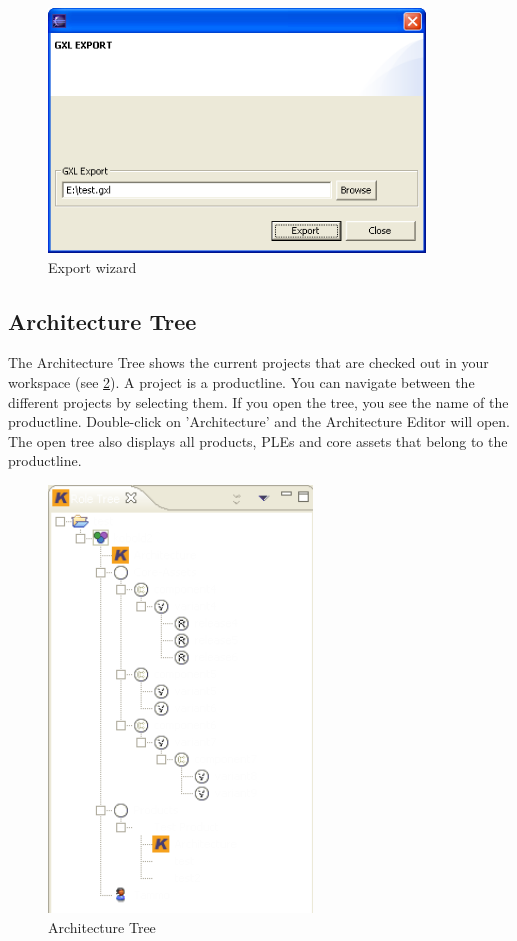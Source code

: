 \begin{figure}[h!]
\begin{center}
\includegraphics[width=10cm]{export.png}
   \caption{Export wizard}
\label{export}
\end{center}
\end{figure}\par







\subsection{Architecture Tree}

The Architecture Tree shows the current projects that are checked out in your workspace 
(see \ref{roletree}).
A project is a productline. You can navigate between the 
different projects by selecting them. If you open the tree, you see the name
of the productline. Double-click on 'Architecture' and the Architecture Editor will open. The open tree also 
displays all products, PLEs and core assets that belong to the productline.

\begin{figure}[h!]
\begin{center}
\includegraphics[width=7cm]{roletree.png}
   \caption{Architecture Tree}
\label{roletree}
\end{center}
\end{figure}\par

